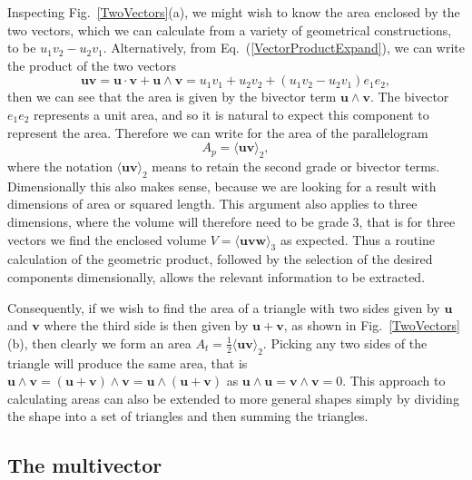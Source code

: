 \documentclass[prb,preprint]{revtex4}
\newcommand{\be}{\begin{equation}}
\newcommand{\ee}{\end{equation}}
\begin{document}
Inspecting Fig.~\ref{TwoVectors}(a), we might wish to know the area enclosed by the two vectors, which we can calculate from a variety of geometrical constructions, to be $ u_1 v_2 - u_2 v_1 $.  Alternatively, from Eq.~(\ref{VectorProductExpand}), we can write the product of the two vectors
\be \label{geoProductFull}
\boldsymbol{u} \boldsymbol{v} = \boldsymbol{u} \cdot \boldsymbol{v} + \boldsymbol{u} \wedge \boldsymbol{v} = u_1 v_1 + u_2 v_2 + (u_1 v_2 - u_2 v_1) e_1 e_2 ,
\ee
then we can see that the area is given by the bivector term $ \boldsymbol{u} \wedge \boldsymbol{v} $.  The bivector $ e_1 e_2 $ represents a unit area, and so it is natural to expect this component to represent the area.  Therefore we can write for the area of the parallelogram
\be
A_p = \langle \boldsymbol{u} \boldsymbol{v} \rangle_2 ,
\ee
where the notation $ \langle \boldsymbol{u} \boldsymbol{v} \rangle_2 $ means to retain the second grade or bivector terms.  Dimensionally this also makes sense, because we are looking for a result with dimensions of area or squared length.
This argument also applies to three dimensions, where the volume will therefore need to be grade 3, that is for three vectors we find the enclosed volume $ V = \langle \boldsymbol{u} \boldsymbol{v} \boldsymbol{w} \rangle_3 $ as expected.
Thus a routine calculation of the geometric product, followed by the selection of the desired components dimensionally, allows the relevant information to be extracted.

Consequently, if we wish to find the area of a triangle with two sides given by $ \boldsymbol{u} $ and $ \boldsymbol{v} $ where the third side is then given by $ \boldsymbol{u} + \boldsymbol{v} $, as shown in Fig.~\ref{TwoVectors}(b), then clearly we form an area $ A_t = \frac{1}{2} \langle \boldsymbol{u} \boldsymbol{v} \rangle_2 $.  Picking any two sides of the triangle will produce the same area, that is $ \boldsymbol{u} \wedge \boldsymbol{v} = (\boldsymbol{u} + \boldsymbol{v}) \wedge  \boldsymbol{v} = \boldsymbol{u} \wedge  (\boldsymbol{u} + \boldsymbol{v} ) $ as $ \boldsymbol{u} \wedge \boldsymbol{u} = \boldsymbol{v} \wedge \boldsymbol{v} =  0 $.
This approach to calculating areas can also be extended to more general shapes simply by dividing the shape into a set of triangles and then summing the triangles.


\subsection{The multivector}
\end{document}
